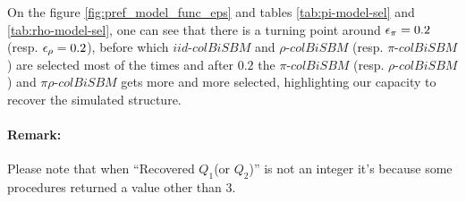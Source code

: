 On the figure \ref{fig:pref_model_func_eps} and tables
\ref{tab:pi-model-sel} and \ref{tab:rho-model-sel}, one can see that
there is a turning point around \(\eps[\pi] = 0.2\) (resp.
\(\eps[\rho] = 0.2\)), before which \(iid\text{-}colBiSBM\) and
\(\rho\text{-}colBiSBM\) (resp. \(\pi\text{-}colBiSBM\)) are selected
most of the times and after \(0.2\) the \(\pi\text{-}colBiSBM\) (resp.
\(\rho\text{-}colBiSBM\)) and \(\pi\rho\text{-}colBiSBM\) gets more and
more selected, highlighting our capacity to recover the simulated
structure.

\paragraph*{Remark:}

Please note that when ``Recovered \(Q_1\)(or \(Q_2\))'' is not an
integer it's because some procedures returned a value other than 3.
